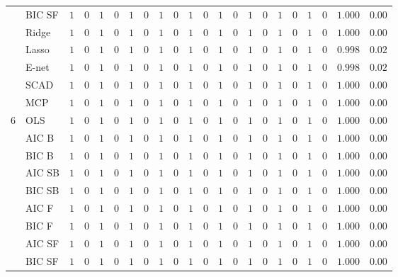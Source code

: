 \begin{tabular}{llllllllllllllllllllll}
	& BIC SF  & $1$ & $0$ & $1$ & $0$ & $1$ & $0$ & $1$ & $0$ & $1$ & $0$ & $1$ & $0$ & $1$ & $0$ & $1$ & $0$ & $1$ & $0$ & $1.000$ & $0.00$ \\
	& Ridge  & $1$ & $0$ & $1$ & $0$ & $1$ & $0$ & $1$ & $0$ & $1$ & $0$ & $1$ & $0$ & $1$ & $0$ & $1$ & $0$ & $1$ & $0$ & $1.000$ & $0.00$ \\
	& Lasso  & $1$ & $0$ & $1$ & $0$ & $1$ & $0$ & $1$ & $0$ & $1$ & $0$ & $1$ & $0$ & $1$ & $0$ & $1$ & $0$ & $1$ & $0$ & $0.998$ & $0.02$ \\
	& E-net  & $1$ & $0$ & $1$ & $0$ & $1$ & $0$ & $1$ & $0$ & $1$ & $0$ & $1$ & $0$ & $1$ & $0$ & $1$ & $0$ & $1$ & $0$ & $0.998$ & $0.02$ \\
	& SCAD  & $1$ & $0$ & $1$ & $0$ & $1$ & $0$ & $1$ & $0$ & $1$ & $0$ & $1$ & $0$ & $1$ & $0$ & $1$ & $0$ & $1$ & $0$ & $1.000$ & $0.00$ \\
	& MCP  & $1$ & $0$ & $1$ & $0$ & $1$ & $0$ & $1$ & $0$ & $1$ & $0$ & $1$ & $0$ & $1$ & $0$ & $1$ & $0$ & $1$ & $0$ & $1.000$ & $0.00$ \\
	6 & OLS  & $1$ & $0$ & $1$ & $0$ & $1$ & $0$ & $1$ & $0$ & $1$ & $0$ & $1$ & $0$ & $1$ & $0$ & $1$ & $0$ & $1$ & $0$ & $1.000$ & $0.00$ \\
	& AIC B  & $1$ & $0$ & $1$ & $0$ & $1$ & $0$ & $1$ & $0$ & $1$ & $0$ & $1$ & $0$ & $1$ & $0$ & $1$ & $0$ & $1$ & $0$ & $1.000$ & $0.00$ \\
	& BIC B  & $1$ & $0$ & $1$ & $0$ & $1$ & $0$ & $1$ & $0$ & $1$ & $0$ & $1$ & $0$ & $1$ & $0$ & $1$ & $0$ & $1$ & $0$ & $1.000$ & $0.00$ \\
	& AIC SB  & $1$ & $0$ & $1$ & $0$ & $1$ & $0$ & $1$ & $0$ & $1$ & $0$ & $1$ & $0$ & $1$ & $0$ & $1$ & $0$ & $1$ & $0$ & $1.000$ & $0.00$ \\
	& BIC SB  & $1$ & $0$ & $1$ & $0$ & $1$ & $0$ & $1$ & $0$ & $1$ & $0$ & $1$ & $0$ & $1$ & $0$ & $1$ & $0$ & $1$ & $0$ & $1.000$ & $0.00$ \\
	& AIC F  & $1$ & $0$ & $1$ & $0$ & $1$ & $0$ & $1$ & $0$ & $1$ & $0$ & $1$ & $0$ & $1$ & $0$ & $1$ & $0$ & $1$ & $0$ & $1.000$ & $0.00$ \\
	& BIC F  & $1$ & $0$ & $1$ & $0$ & $1$ & $0$ & $1$ & $0$ & $1$ & $0$ & $1$ & $0$ & $1$ & $0$ & $1$ & $0$ & $1$ & $0$ & $1.000$ & $0.00$ \\
	& AIC SF  & $1$ & $0$ & $1$ & $0$ & $1$ & $0$ & $1$ & $0$ & $1$ & $0$ & $1$ & $0$ & $1$ & $0$ & $1$ & $0$ & $1$ & $0$ & $1.000$ & $0.00$ \\
	& BIC SF  & $1$ & $0$ & $1$ & $0$ & $1$ & $0$ & $1$ & $0$ & $1$ & $0$ & $1$ & $0$ & $1$ & $0$ & $1$ & $0$ & $1$ & $0$ & $1.000$ & $0.00$ \\

\end{tabular}
